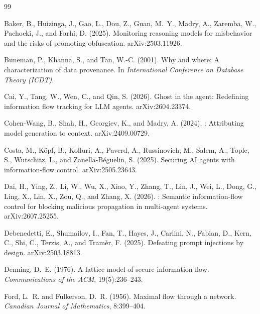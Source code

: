 \documentclass[11pt, a4paper]{article}
\theoremstyle{definition}
\begin{document}
\begin{thebibliography}{99}

Baker, B., Huizinga, J., Gao, L., Dou, Z., Guan, M.~Y., Madry, A., Zaremba, W., Pachocki, J., and Farhi, D. (2025).
\newblock Monitoring reasoning models for misbehavior and the risks of promoting obfuscation.
\newblock arXiv:2503.11926.

Buneman, P., Khanna, S., and Tan, W.-C. (2001).
\newblock Why and where: A characterization of data provenance.
\newblock In \emph{International Conference on Database Theory (ICDT)}.

Cai, Y., Tang, W., Wen, C., and Qin, S. (2026).
\newblock Ghost in the agent: Redefining information flow tracking for {LLM} agents.
\newblock arXiv:2604.23374.

Cohen-Wang, B., Shah, H., Georgiev, K., and Madry, A. (2024).
: Attributing model generation to context.
\newblock arXiv:2409.00729.

Costa, M., K\"opf, B., Kolluri, A., Paverd, A., Russinovich, M., Salem, A., Tople, S., Wutschitz, L., and Zanella-B\'eguelin, S. (2025).
\newblock Securing {AI} agents with information-flow control.
\newblock arXiv:2505.23643.

Dai, H., Ying, Z., Li, W., Wu, X., Xiao, Y., Zhang, T., Lin, J., Wei, L., Dong, G., Ling, X., Lin, X., Zou, Q., and Zhang, X. (2026).
: Semantic information-flow control for blocking malicious propagation in multi-agent systems.
\newblock arXiv:2607.25255.

Debenedetti, E., Shumailov, I., Fan, T., Hayes, J., Carlini, N., Fabian, D., Kern, C., Shi, C., Terzis, A., and Tram\`er, F. (2025).
\newblock Defeating prompt injections by design.
\newblock arXiv:2503.18813.

Denning, D.~E. (1976).
\newblock A lattice model of secure information flow.
\newblock \emph{Communications of the ACM}, 19(5):236--243.

Ford, L.~R. and Fulkerson, D.~R. (1956).
\newblock Maximal flow through a network.
\newblock \emph{Canadian Journal of Mathematics}, 8:399--404.


\end{thebibliography}
\end{document}

